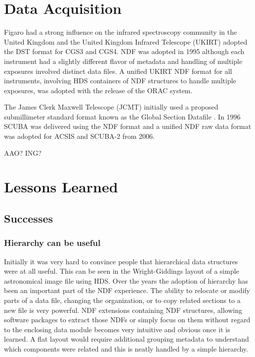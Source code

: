 \documentclass[final,authoryear,5p,times,twocolumn]{elsarticle}
\begin{document}
{\section{Data Acquisition}

Figaro had a strong influence on the infrared spectroscopy community
in the United Kingdom and the United Kingdom Infrared Telescope
(UKIRT) adopted the DST format for CGS3 and CGS4. NDF was adopted in
1995 although each instrument had a slightly different flavor of
metadata and handling of multiple exposures involved distinct data
files. A unified UKIRT NDF format for all instruments, involving HDS
containers of NDF structures to handle multiple exposures, was
adopted with the release of the ORAC system.

The James Clerk Maxwell Telescope (JCMT) initially used a proposed
submillimeter standard format known as the Global Section Datafile
\citep[GSD;][formerly General Single Dish Data]{sun229}. In 1996 SCUBA
was delivered using the NDF format and a unified NDF raw data format
was adopted for ACSIS and SCUBA-2 from 2006.

{\color{red}AAO? ING?}

\section{Lessons Learned}

\subsection{Successes}

\subsubsection{Hierarchy can be useful}

Initially it was very hard to convince people that hierarchical data
structures were at all useful. This can be seen in the Wright-Giddings
layout of a simple astronomical image file using HDS. Over the years
the adoption of hierarchy has been an important part of the NDF
experience. The ability to relocate or modify parts of a data file,
changing the organization, or to copy related sections to a new file
is very powerful.  NDF extensions containing NDF structures, allowing
software packages to extract those NDFs or simply focus on them
without regard to the enclosing data module becomes very intuitive and
obvious once it is learned. A flat layout would require additional
grouping metadata to understand which components were related and this
is neatly handled by a simple hierarchy.

}
\end{document}
